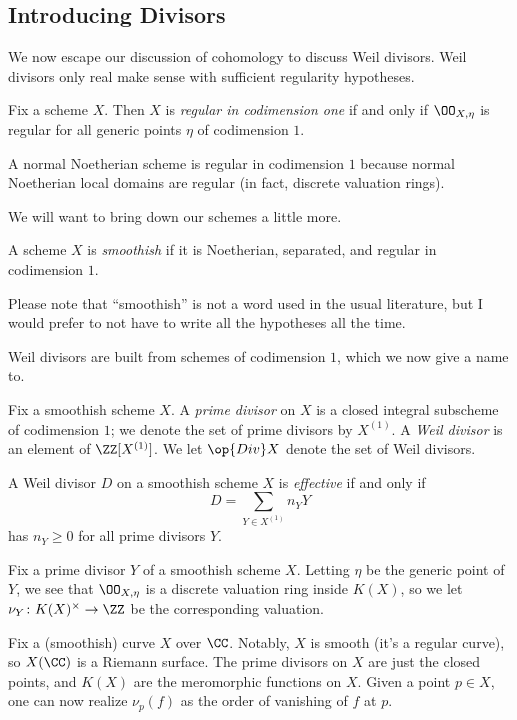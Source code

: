 \documentclass[../notes.tex]{subfiles}
\begin{document}
\subsection{Introducing Divisors}
We now escape our discussion of cohomology to discuss Weil divisors. Weil divisors only real make sense with sufficient regularity hypotheses.
\begin{definition}
	Fix a scheme $X$. Then $X$ is \textit{regular in codimension one} if and only if $\OO_{X,\eta}$ is regular for all generic points $\eta$ of codimension $1$.
\end{definition}
\begin{remark}
	A normal Noetherian scheme is regular in codimension $1$ because normal Noetherian local domains are regular (in fact, discrete valuation rings).
\end{remark}
We will want to bring down our schemes a little more.
\begin{definition}[smoothish]
	A scheme $X$ is \textit{smoothish} if it is Noetherian, separated, and regular in codimension $1$.
\end{definition}
Please note that ``smoothish'' is not a word used in the usual literature, but I would prefer to not have to write all the hypotheses all the time.

Weil divisors are built from schemes of codimension $1$, which we now give a name to.
\begin{definition}
	Fix a smoothish scheme $X$. A \textit{prime divisor} on $X$ is a closed integral subscheme of codimension $1$; we denote the set of prime divisors by $X^{(1)}$. A \textit{Weil divisor} is an element of $\ZZ[X^{(1)}]$. We let $\op{Div}X$ denote the set of Weil divisors.
\end{definition}
\begin{definition}[effective]
	A Weil divisor $D$ on a smoothish scheme $X$ is \textit{effective} if and only if
	\[D=\sum_{Y\in X^{(1)}}n_YY\]
	has $n_Y\ge0$ for all prime divisors $Y$.
\end{definition}
\begin{notation}
	Fix a prime divisor $Y$ of a smoothish scheme $X$. Letting $\eta$ be the generic point of $Y$, we see that $\OO_{X,\eta}$ is a discrete valuation ring inside $K(X)$, so we let $\nu_Y\colon K(X)^\times\to\ZZ$ be the corresponding valuation.
\end{notation}
\begin{example}
	Fix a (smoothish) curve $X$ over $\CC$. Notably, $X$ is smooth (it's a regular curve), so $X(\CC)$ is a Riemann surface. The prime divisors on $X$ are just the closed points, and $K(X)$ are the meromorphic functions on $X$. Given a point $p\in X$, one can now realize $\nu_p(f)$ as the order of vanishing of $f$ at $p$.
\end{example}
\end{document}
